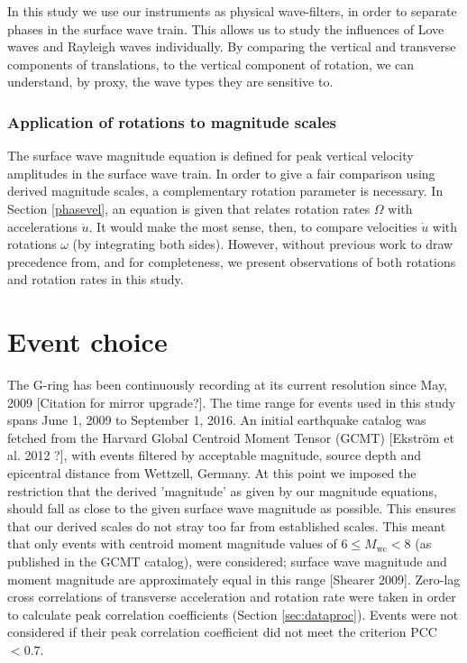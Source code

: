 \documentclass{gji}
\begin{document}
In this study we use our instruments as physical wave-filters, in order to separate phases in the surface wave train. This allows us to study the influences of Love waves and Rayleigh waves individually. By comparing the vertical and transverse components of translations, to the vertical component of rotation, we can understand, by proxy, the wave types they are sensitive to.

\subsubsection{Application of rotations to magnitude scales}
The surface wave magnitude equation is defined for peak vertical velocity amplitudes in the surface wave train. In order to give a fair comparison using derived magnitude scales, a complementary rotation parameter is necessary. In Section \ref{phasevel}, an equation is given that relates rotation rates $\Omega$ with accelerations $\ddot{u}$. It would make the most sense, then, to compare velocities $\dot{u}$ with rotations $\omega$ (by integrating both sides). However, without previous work to draw precedence from, and for completeness, we present observations of both rotations and rotation rates in this study.

\section{Event choice}
The G-ring has been continuously recording at its current resolution since May, 2009 [Citation for mirror upgrade?]. 
The time range for events used in this study spans June 1, 2009 to September 1, 2016. An initial earthquake catalog was fetched from the Harvard Global Centroid Moment Tensor (GCMT) [Ekstr\"om et al. 2012 ?], %
with events filtered by acceptable magnitude, source depth and epicentral distance from Wettzell, Germany. At this point we imposed the restriction that the derived 'magnitude' as given by our magnitude equations, should fall as close to the given surface wave magnitude as possible. This ensures that our derived scales do not stray too far from established scales. This meant that only events with centroid moment magnitude values of $6 \le M_{\text{wc}} < 8$ (as published in the GCMT catalog), were considered;   surface wave magnitude and moment magnitude are approximately equal in this range [Shearer 2009]. %
Zero-lag cross correlations of transverse acceleration and rotation rate were taken in order to calculate peak correlation coefficients (Section \ref{sec:dataproc}). Events were not considered if their peak correlation coefficient did not meet the criterion PCC $< 0.7$. 
\end{document}
